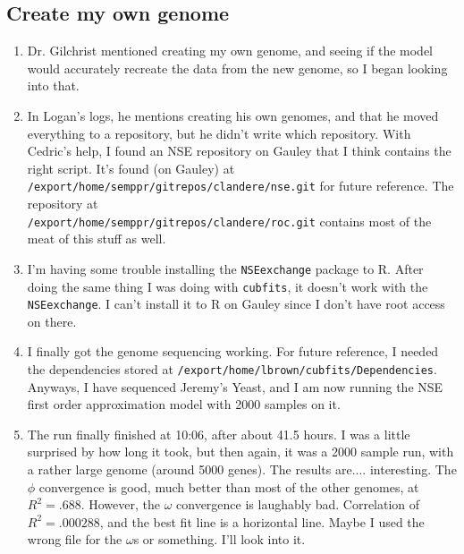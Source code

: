 \documentclass[12 pt]{article}
\begin{document}
 		\subsection{Create my own genome}
 		\begin{enumerate}
 			\item Dr. Gilchrist mentioned creating my own genome, and seeing if the model would accurately recreate the data from the new genome, so I began looking into that.
 			\item In Logan's logs, he mentions creating his own genomes, and that he moved everything to a repository, but he didn't write which repository. With Cedric's help, I found an NSE repository on Gauley that I think contains the right script. It's found (on Gauley) at \\
 			\texttt{/export/home/semppr/gitrepos/clandere/nse.git} for future reference. The repository at \\
 			\texttt{/export/home/semppr/gitrepos/clandere/roc.git} contains most of the meat of this stuff as well.
 			\item I'm having some trouble installing the \texttt{NSEexchange} package to R. After doing the same thing I was doing with \texttt{cubfits}, it doesn't work with the \texttt{NSEexchange}. I can't install it to R on Gauley since I don't have root access on there.
 			\item I finally got the genome sequencing working. For future reference, I needed the dependencies stored at \texttt{/export/home/lbrown/cubfits/Dependencies}. Anyways, I have sequenced Jeremy's Yeast, and I am now running the NSE first order approximation model with 2000 samples on it.
 			\item The run finally finished at 10:06, after about 41.5 hours. I was a little surprised by how long it took, but then again, it was a 2000 sample run, with a rather large genome (around 5000 genes). The results are.... interesting. The $ \phi $ convergence is good, much better than most of the other genomes, at $ R^2 = .688 $. However, the $ \omega $ convergence is laughably bad. Correlation of $ R^2=.000288 $, and the best fit line is a horizontal line. Maybe I used the wrong file for the $ \omega $s or something. I'll look into it.
 			
 			
 			
 		\end{enumerate}
 		
\end{document}
